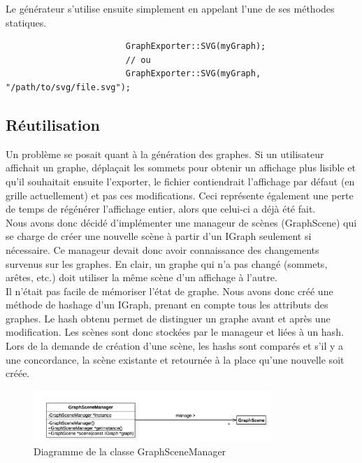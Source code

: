 \documentclass[french]{article}
\begin{document}
			Le générateur s'utilise ensuite simplement en appelant l'une de ses méthodes statiques.
		
			\begin{lstlisting}
						GraphExporter::SVG(myGraph);
						// ou
						GraphExporter::SVG(myGraph, "/path/to/svg/file.svg");
			\end{lstlisting}
		
		\subsection{Réutilisation}
			Un problème se posait quant à la génération des graphes. Si un utilisateur affichait un graphe, déplaçait les sommets pour obtenir un affichage plus lisible et qu'il souhaitait ensuite l'exporter, le fichier contiendrait l'affichage par défaut (en grille actuellement) et pas ces modifications. Ceci représente également une perte de temps de régénérer l'affichage entier, alors que celui-ci a déjà été fait. \\
			Nous avons donc décidé d'implémenter une manageur de scènes (GraphScene) qui se charge de créer une nouvelle scène à partir d'un IGraph seulement si nécessaire. Ce manageur devait donc avoir connaissance des changements survenus sur les graphes. En clair, un graphe qui n'a pas changé (sommets, arêtes, etc.) doit utiliser la même scène d'un affichage à l'autre. \\
			
			Il n'était pas facile de mémoriser l'état de graphe. Nous avons donc créé une méthode de hashage d'un IGraph, prenant en compte tous les attributs des graphes. Le hash obtenu permet de distinguer un graphe avant et après une modification. Les scènes sont donc stockées par le manageur et liées à un hash. Lors de la demande de création d'une scène, les hashs sont comparés et s'il y a une concordance, la scène existante et retournée à la place qu'une nouvelle soit créée.
			
			\begin{figure}[H]
				\centering
				\includegraphics[width=0.8\textwidth]{Conception/visualization/graphscenemanager.png}
				\caption{Diagramme de la classe GraphSceneManager}
			\end{figure}
			
\end{document}
